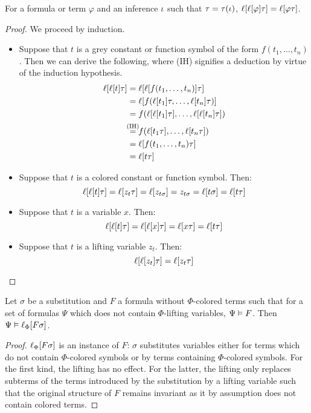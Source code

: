 \begin{lemma}
	\label{lemma:lifting_tau_commute}
	For a formula or term $\varphi$ and an inference $\iota$ such that $\tau = \tau(\iota)$,
	$\lifboth{\lifboth{ \varphi} \tau} =\nolinebreak \lifboth{ \varphi \tau } $.
\end{lemma}
\begin{proof}
	We proceed by induction.

	\begin{itemize}
		\item Suppose that $t$ is a grey constant or function symbol of the form $f(t_1, \dots, t_n)$.
			Then we can derive the following, where (IH) signifies a deduction by virtue of the induction hypothesis. 
			\begin{align*}
				\lifboth{\lifboth{t}\tau} &= \lifboth{\lifboth{ f(t_1, \dots, t_n)}\tau} \\
																							&= \lifboth{ f(\lifboth{t_1}\tau, \dots, \lifboth{t_n}\tau) } \\
																				&= f(\lifboth{\lifboth{t_1}\tau}, \dots, \lifboth{\lifboth{t_n}\tau}) \\
																		&\stackrel{\mathclap{\text{(IH)}}}= f(\lifboth{t_1\tau}, \dots, \lifboth{t_n\tau}) \\
																	 &= \lifboth{f(t_1, \dots, t_n)\tau} \\
																	 &= \lifboth{t\tau}
			\end{align*}
		\item Suppose that $t$ is a colored constant or function symbol. Then:
			\[
				\ell[\ell[t]\tau]= \ell[z_t\tau] 
				= \ell[z_{t\sigma}] 
				= z_{t\sigma} 
				= \ell[t\sigma] 
				= \ell[t\tau]
			\]
		\item Suppose that $t$ is a variable $x$. Then:
			\[
				\ell[\ell[t]\tau] = \ell[\ell[ x]\tau] = \ell[x\tau] = \ell[t\tau]
			\]
		\item Suppose that $t$ is a lifting variable $z_t$. Then:
			\[
				\ell[\ell[z_t]\tau] = \ell[z_t\tau] 
				\qedhere
			\]
	\end{itemize}

\end{proof}

\begin{lemma}
	\label{lemma:substitute_and_lift}
	Let $\sigma$ be a substitution and $F$ a formula without $\Phi$-colored terms such that for a set of formulas $\Psi$ which does not contain $\Phi$-lifting variables, $\Psi \vDash F$.
	Then $\Psi \vDash \ell_{\Phi}[F\sigma]$.
\end{lemma}
\begin{proof}
	$\ell_{\Phi}[F\sigma]$ is an instance of $F$:
	$\sigma$ substitutes variables either for terms which do not contain $\Phi$-colored symbols or by terms containing $\Phi$-colored symbols.
	For the first kind, the lifting has no effect.
	For the latter, the lifting only replaces subterms of the terms introduced by the substitution by a lifting variable such that the original structure of $F$ remains invariant as it by assumption does not contain colored terms.
\end{proof}


